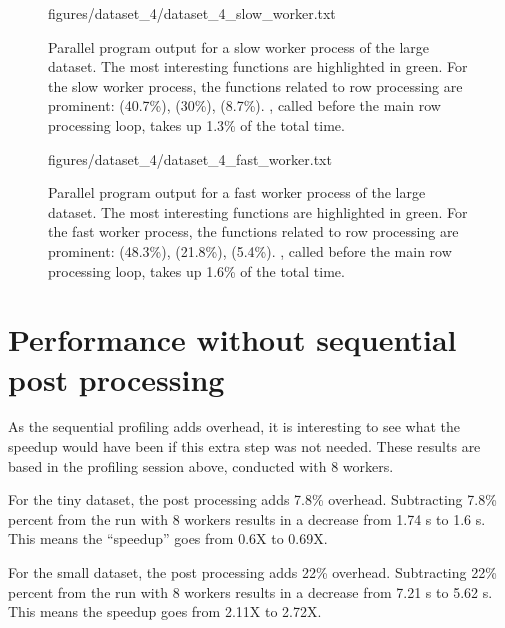 \begin{figure}[ht]
  \begin{VerbatimInput}{figures/dataset_4/dataset_4_slow_worker.txt}
    \caption[Parallel program  output for a slow worker process of the large dataset.]{Parallel program  output for a slow worker process of the large dataset.
    The most interesting functions are highlighted in green.
For the slow worker process, the functions related to row processing are prominent:  (40.7\%),  (30\%), 
(8.7\%). , called before the main row processing loop, takes up 1.3\% of the total time.}
  \label{fig:profiler_large_slow_worker}
\end{VerbatimInput}
\end{figure}

\begin{figure}[ht]
  \begin{VerbatimInput}{figures/dataset_4/dataset_4_fast_worker.txt}
    \caption[Parallel program  output for a fast worker process of the large dataset.]{Parallel program  output for a fast worker process of the large dataset.
    The most interesting functions are highlighted in green.
For the fast worker process, the functions related to row processing are prominent:  (48.3\%),  (21.8\%), 
(5.4\%). , called before the main row processing loop, takes up 1.6\% of the total time.}
  \label{fig:profiler_large_fast_worker}
\end{VerbatimInput}
\end{figure}

\section{Performance without sequential post processing}
As the sequential profiling adds overhead, it is interesting to see what the speedup would have been if this extra step was not needed.
These results are based in the profiling session above, conducted with 8 workers.

For the tiny dataset, the post processing adds 7.8\% overhead. Subtracting 7.8\% percent from the run with 8 workers results in a decrease
from 1.74 s to 1.6 s. This means the ``speedup'' goes from 0.6X to 0.69X.

For the small dataset, the post processing adds 22\% overhead. Subtracting 22\% percent from the run with 8 workers results in a decrease
from 7.21 s to 5.62 s. This means the speedup goes from 2.11X to 2.72X.

